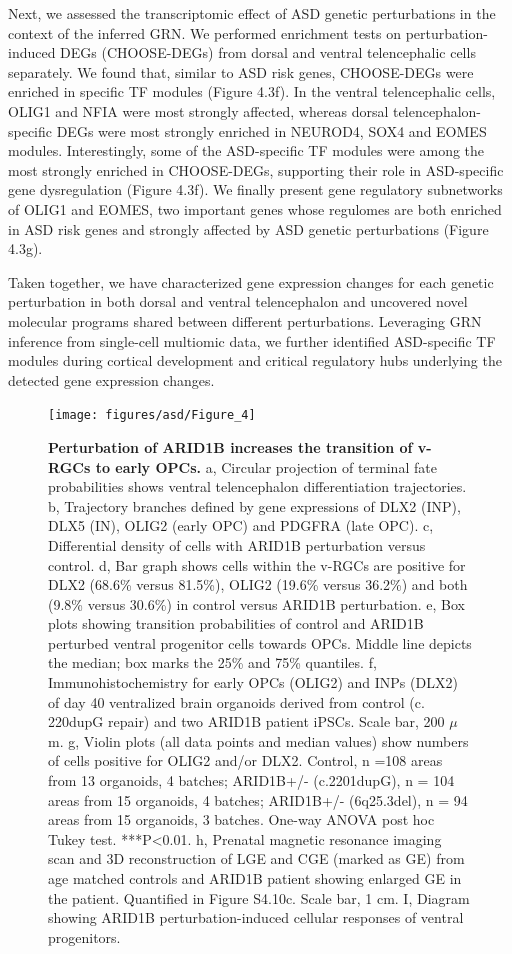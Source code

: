 Next, we assessed the transcriptomic effect of ASD genetic perturbations in the context of the inferred GRN. We performed enrichment tests on perturbation-induced DEGs (CHOOSE-DEGs) from dorsal and ventral telencephalic cells separately. We found that, similar to ASD risk genes, CHOOSE-DEGs were enriched in specific TF modules (Figure 4.3f). In the ventral telencephalic cells, OLIG1 and NFIA were most strongly affected, whereas dorsal telencephalon-specific DEGs were most strongly enriched in NEUROD4, SOX4 and EOMES modules. Interestingly, some of the ASD-specific TF modules were among the most strongly enriched in CHOOSE-DEGs, supporting their role in ASD-specific gene dysregulation (Figure 4.3f). We finally present gene regulatory subnetworks of OLIG1 and EOMES, two important genes whose regulomes are both enriched in ASD risk genes and strongly affected by ASD genetic perturbations (Figure 4.3g). 

Taken together, we have characterized gene expression changes for each genetic perturbation in both dorsal and ventral telencephalon and uncovered novel molecular programs shared between different perturbations. Leveraging GRN inference from single-cell multiomic data, we further identified ASD-specific TF modules during cortical development and critical regulatory hubs underlying the detected gene expression changes.

\begin{figure}[b!]
    \centering
	\texttt{[image: figures/asd/Figure\_4]}
    \caption{\textbf{Perturbation of ARID1B increases the transition of v-RGCs to early OPCs.}
    a, Circular projection of terminal fate probabilities shows ventral telencephalon differentiation trajectories. b, Trajectory branches defined by gene expressions of DLX2 (INP), DLX5 (IN), OLIG2 (early OPC) and PDGFRA (late OPC). c, Differential density of cells with ARID1B perturbation versus control. d, Bar graph shows cells within the v-RGCs are positive for DLX2 (68.6\% versus 81.5\%), OLIG2 (19.6\% versus 36.2\%) and both (9.8\% versus 30.6\%) in control versus ARID1B perturbation. e, Box plots showing transition probabilities of control and ARID1B perturbed ventral progenitor cells towards OPCs. Middle line depicts the median; box marks the 25\% and 75\% quantiles. f, Immunohistochemistry for early OPCs (OLIG2) and INPs (DLX2) of day 40 ventralized brain organoids derived from control (c. 220dupG repair) and two ARID1B patient iPSCs. Scale bar, 200 $\mu$m. g, Violin plots (all data points and median values) show numbers of cells positive for OLIG2 and/or DLX2. Control, n =108 areas from 13 organoids, 4 batches; ARID1B+/- (c.2201dupG), n = 104 areas from 15 organoids, 4 batches; ARID1B+/- (6q25.3del), n = 94 areas from 15 organoids, 3 batches. One-way ANOVA post hoc Tukey test. ***P<0.01. h, Prenatal magnetic resonance imaging scan and 3D reconstruction of LGE and CGE (marked as GE) from age matched controls and ARID1B patient showing enlarged GE in the patient. Quantified in Figure S4.10c. Scale bar, 1 cm. I, Diagram showing ARID1B perturbation-induced cellular responses of ventral progenitors.}
    \label{fig:asd4}
\end{figure}

